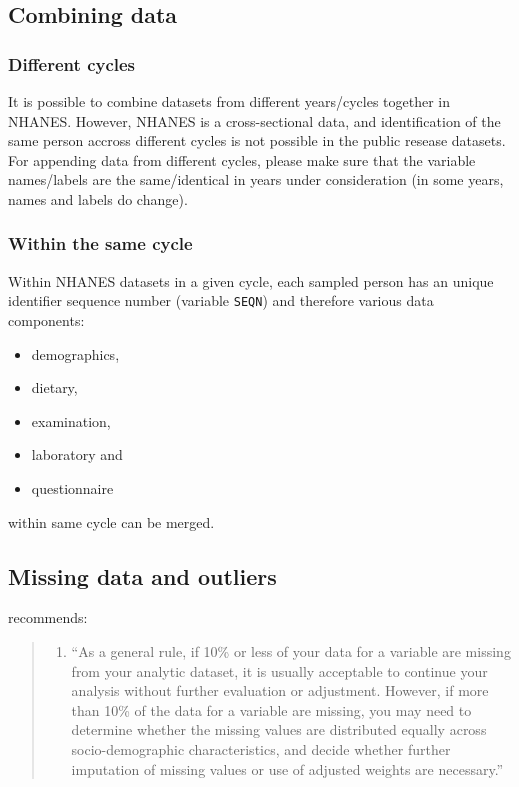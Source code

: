 \documentclass[
]{book}
\providecommand{\tightlist}{%
  \setlength{\itemsep}{0pt}\setlength{\parskip}{0pt}}
\begin{document}
\hypertarget{combining-data}{%
\subsection{Combining data}\label{combining-data}}

\hypertarget{different-cycles}{%
\subsubsection{Different cycles}\label{different-cycles}}

It is possible to combine datasets from different years/cycles together in NHANES. However, NHANES is a cross-sectional data, and identification of the same person accross different cycles is not possible in the public resease datasets. For appending data from different cycles, please make sure that the variable names/labels are the same/identical in years under consideration (in some years, names and labels do change).

\hypertarget{within-the-same-cycle}{%
\subsubsection{Within the same cycle}\label{within-the-same-cycle}}

Within NHANES datasets in a given cycle, each sampled person has an unique identifier sequence number (variable \texttt{SEQN}) and therefore various data components:

\begin{itemize}
\tightlist
\item
  demographics,
\item
  dietary,
\item
  examination,
\item
  laboratory and
\item
  questionnaire
\end{itemize}

within same cycle can be merged.

\hypertarget{missing-data-and-outliers}{%
\subsection{Missing data and outliers}\label{missing-data-and-outliers}}

\citet{CDCfaq} recommends:

\begin{quote}
\begin{enumerate}
\def\labelenumi{\arabic{enumi}.}
\tightlist
\item
  ``As a general rule, if 10\% or less of your data for a variable are missing from your analytic dataset, it is usually acceptable to continue your analysis without further evaluation or adjustment. However, if more than 10\% of the data for a variable are missing, you may need to determine whether the missing values are distributed equally across socio-demographic characteristics, and decide whether further imputation of missing values or use of adjusted weights are necessary.''
\end{enumerate}
\end{quote}
\end{document}
